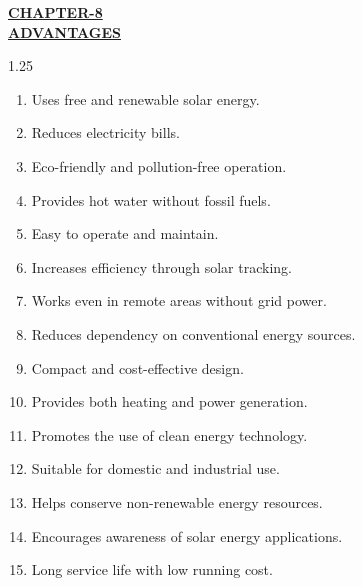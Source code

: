 \begin{center}
  {\fontsize{15}{18}\selectfont \bfseries \textcolor{red!80!black}{\underline{CHAPTER-8}}}\\[2mm]
  {\fontsize{16}{20}\selectfont \bfseries \textcolor{red!80!black}{\underline{ADVANTAGES}}}\\[6mm]
\end{center}

\begin{spacing}{1.25}
{\fontsize{10.5}{14.5}\selectfont
\begin{enumerate}[leftmargin=8mm, itemsep=2.2mm]
  \item Uses free and renewable solar energy.
  \item Reduces electricity bills.
  \item Eco-friendly and pollution-free operation.
  \item Provides hot water without fossil fuels.
  \item Easy to operate and maintain.
  \item Increases efficiency through solar tracking.
  \item Works even in remote areas without grid power.
  \item Reduces dependency on conventional energy sources.
  \item Compact and cost-effective design.
  \item Provides both heating and power generation.
  \item Promotes the use of clean energy technology.
  \item Suitable for domestic and industrial use.
  \item Helps conserve non-renewable energy resources.
  \item Encourages awareness of solar energy applications.
  \item Long service life with low running cost.
\end{enumerate}
}
\end{spacing}
\clearpage
